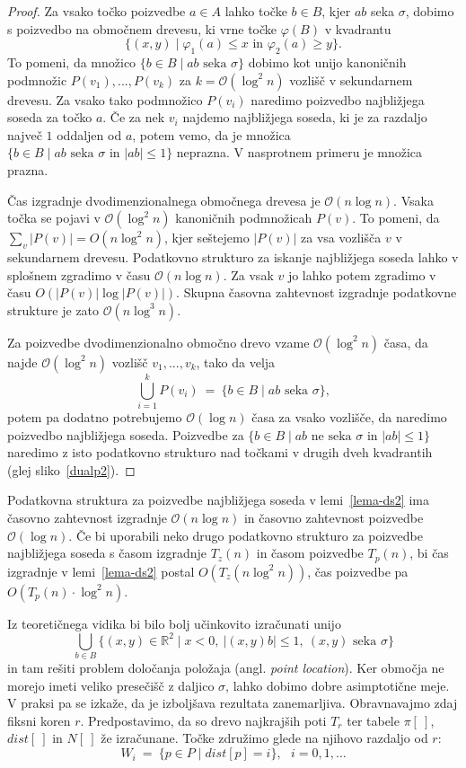 \documentclass[a4paper, 12pt]{book}
\newcommand{\RR}{\ensuremath{\mathbb R}}  %
\newcommand{\OO}{\ensuremath{\mathcal{O}}} %
\def\dist{\mathit{dist}}
\begin{document}
\begin{proof}
Za vsako točko poizvedbe $a \in A$ lahko točke $b \in B$, kjer $ab$ seka $\sigma$, dobimo s poizvedbo na območnem drevesu, ki vrne točke $\varphi(B)$ v kvadrantu
\[
		\{(x,y)\mid  \varphi_1(a) \leq x \text{ in } \varphi_2(a) \geq y\}.
\]
To pomeni, da množico $\{ b\in B \mid \text{$ab$ seka $\sigma$}\}$ dobimo kot unijo kanoničnih podmnožic $P(v_1),...,P(v_k)$ za $k = \OO(\log^2n)$ vozlišč v sekundarnem drevesu. Za vsako tako podmnožico $P(v_i)$ naredimo poizvedbo najbližjega soseda za točko $a$. Če za nek $v_i$ najdemo najbližjega soseda, ki je za razdaljo največ $1$ oddaljen od $a$, potem vemo, da je množica $\{ b\in B \mid \text{$ab$ seka $\sigma$ in $|ab|\le 1$}\}$ neprazna. V nasprotnem primeru je množica prazna.

Čas izgradnje dvodimenzionalnega območnega drevesa je $\OO(n\log n)$. Vsa\-ka točka se pojavi v $\OO(\log^2n)$ kanoničnih podmnožicah $P(v)$. To pomeni, da $\sum_v |P(v)| = O( n\log^2 n)$, kjer seštejemo $|P(v)|$ za vsa vozlišča $v$ v sekundarnem drevesu. Podatkovno strukturo za iskanje najbližjega soseda lahko v splošnem zgradimo v času $\OO(n\log n)$. Za vsak $v$ jo lahko potem zgradimo v času $O(|P(v)| \log |P(v)|)$. Skupna časovna zahtevnost izgradnje podatkovne strukture je zato $\OO(n\log^3n)$.

Za poizvedbe dvodimenzionalno območno drevo vzame $\OO(\log^2n)$ časa, da  najde $\OO(\log^2n)$ vozlišč $v_1,...,v_k$, tako da velja
\[
		\bigcup_{i=1}^k P(v_i) ~=~ \{ b\in B \mid \text{$ab$ seka $\sigma$}\},
\]
potem pa dodatno potrebujemo $\OO(\log n)$ časa za vsako vozlišče, da naredimo poizvedbo najbližjega soseda. Poizvedbe za $\{ b\in B \mid \text{$ab$ ne seka $\sigma$ in $|ab|\le 1$}\}$ naredimo z isto podatkovno strukturo nad točkami v drugih dveh kvadrantih (glej sliko~\ref{dualp2}).
\end{proof}

Podatkovna struktura za poizvedbe najbližjega soseda v lemi~\ref{lema-ds2} ima časovno zahtevnost izgradnje $\OO(n\log n)$ in časovno zahtevnost poizvedbe $\OO(\log n)$. Če bi uporabili neko drugo podatkovno strukturo za poizvedbe najbližjega soseda s časom izgradnje $T_z(n)$ in časom poizvedbe $T_p(n)$, bi čas izgradnje v lemi~\ref{lema-ds2} postal $O(T_z(n\log^2 n))$, čas poizvedbe pa $O(T_p(n)\cdot \log^2 n)$.

Iz teoretičnega vidika bi bilo bolj učinkovito izračunati unijo
\[
	\bigcup_{b\in B} \{ (x,y)\in \RR^2\mid x<0,~ |(x,y)b|\le 1,~ (x,y) 
			\text{ seka } \sigma \}
\]
in tam rešiti problem določanja položaja (angl. \textit{point location}). Ker območja ne morejo imeti veliko presečišč z daljico $\sigma$, lahko dobimo dobre asimptotične meje. V praksi pa se izkaže, da je izboljšava rezultata zanemarljiva.
\bigbreak
Obravnavajmo zdaj fiksni koren $r$. Predpostavimo, da so drevo najkrajših poti $T_r$ ter tabele $\pi[~]$, $\dist[~]$ in $N[~]$ že izračunane. Točke združimo glede na njihovo razdaljo od $r$:
\[
	W_i ~=~ \{ p\in P \mid \dist[p]=i \},~~~ i=0,1,\dots
\]
\end{document}
